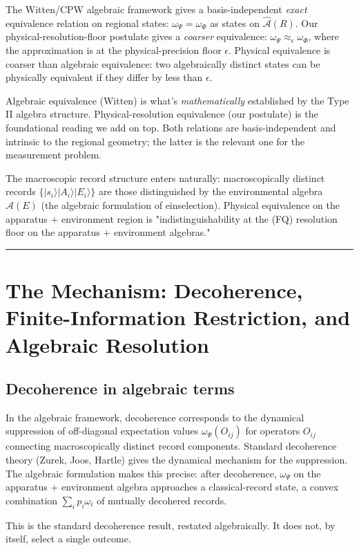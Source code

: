\documentclass[11pt,a4paper]{article}
\begin{document}
The Witten/CPW algebraic framework gives a basis-independent \emph{exact} equivalence relation on regional states: $\omega_\Psi = \omega_\Phi$ as states on $\hat{\mathcal{A}}(R)$. Our physical-resolution-floor postulate gives a \emph{coarser} equivalence: $\omega_\Psi \approx_\epsilon \omega_\Phi$, where the approximation is at the physical-precision floor $\epsilon$. Physical equivalence is coarser than algebraic equivalence: two algebraically distinct states can be physically equivalent if they differ by less than $\epsilon$.

Algebraic equivalence (Witten) is what's \emph{mathematically} established by the Type II algebra structure. Physical-resolution equivalence (our postulate) is the foundational reading we add on top. Both relations are basis-independent and intrinsic to the regional geometry; the latter is the relevant one for the measurement problem.

The macroscopic record structure enters naturally: macroscopically distinct records $\{|s_i\rangle|A_i\rangle|E_i\rangle\}$ are those distinguished by the environmental algebra $\hat{\mathcal{A}}(E)$ (the algebraic formulation of einselection). Physical equivalence on the apparatus + environment region is "indistinguishability at the (FQ) resolution floor on the apparatus + environment algebras."

\medskip\hrule\medskip

\section{The Mechanism: Decoherence, Finite-Information Restriction, and Algebraic Resolution}

\subsection{Decoherence in algebraic terms}

In the algebraic framework, decoherence corresponds to the dynamical suppression of off-diagonal expectation values $\omega_\Psi(O_{ij})$ for operators $O_{ij}$ connecting macroscopically distinct record components. Standard decoherence theory (Zurek, Joos, Hartle) gives the dynamical mechanism for the suppression. The algebraic formulation makes this precise: after decoherence, $\omega_\Psi$ on the apparatus + environment algebra approaches a classical-record state, a convex combination $\sum_i p_i \omega_i$ of mutually decohered records.

This is the standard decoherence result, restated algebraically. It does not, by itself, select a single outcome.
\end{document}
